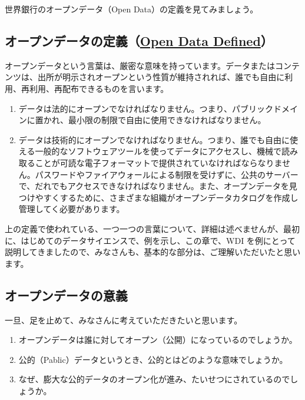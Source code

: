 \documentclass[
  xelatex, ja=standard]{bxjsbook}
\theoremstyle{definition}
\theoremstyle{definition}
\theoremstyle{definition}
\theoremstyle{definition}
\theoremstyle{remark}
\begin{document}
世界銀行のオープンデータ（Open Data）の定義を見てみましょう。

\hypertarget{ux30aaux30fcux30d7ux30f3ux30c7ux30fcux30bfux306eux5b9aux7fa9open-data-defined}{%
\subsection{\texorpdfstring{オープンデータの定義（\href{http://opendatatoolkit.worldbank.org/en/essentials.html}{Open Data Defined}）}{オープンデータの定義（Open Data Defined）}}\label{ux30aaux30fcux30d7ux30f3ux30c7ux30fcux30bfux306eux5b9aux7fa9open-data-defined}}

オープンデータという言葉は、厳密な意味を持っています。データまたはコンテンツは、出所が明示されオープンという性質が維持されれば、誰でも自由に利用、再利用、再配布できるものを言います。

\begin{enumerate}
\def\labelenumi{\arabic{enumi}.}
\item
  データは法的にオープンでなければなりません。つまり、パブリックドメインに置かれ、最小限の制限で自由に使用できなければなりません。
\item
  データは技術的にオープンでなければなりません。つまり、誰でも自由に使える一般的なソフトウェアツールを使ってデータにアクセスし、機械で読み取ることが可読な電子フォーマットで提供されていなければならなりません。パスワードやファイアウォールによる制限を受けずに、公共のサーバーで、だれでもアクセスできなければなりません。また、オープンデータを見つけやすくするために、さまざまな組織がオープンデータカタログを作成し管理してく必要があります。
\end{enumerate}

上の定義で使われている、一つ一つの言葉について、詳細は述べませんが、最初に、はじめてのデータサイエンスで、例を示し、この章で、WDI を例にとって説明してきましたので、みなさんも、基本的な部分は、ご理解いただいたと思います。

\hypertarget{ux30aaux30fcux30d7ux30f3ux30c7ux30fcux30bfux306eux610fux7fa9}{%
\subsection{オープンデータの意義}\label{ux30aaux30fcux30d7ux30f3ux30c7ux30fcux30bfux306eux610fux7fa9}}

一旦、足を止めて、みなさんに考えていただきたいと思います。

\begin{enumerate}
\def\labelenumi{\arabic{enumi}.}
\item
  オープンデータは誰に対してオープン（公開）になっているのでしょうか。
\item
  公的（Pablic）データというとき、公的とはどのような意味でしょうか。
\item
  なぜ、膨大な公的データのオープン化が進み、たいせつにされているのでしょうか。
\end{enumerate}
\end{document}
